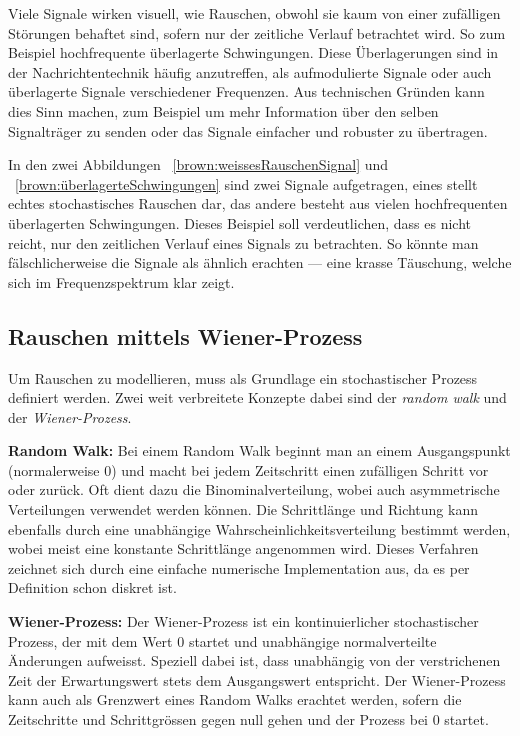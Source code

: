 Viele Signale wirken visuell, wie Rauschen, obwohl sie kaum von einer zufälligen Störungen behaftet sind, sofern nur der zeitliche Verlauf betrachtet wird. So zum Beispiel hochfrequente überlagerte Schwingungen. Diese Überlagerungen sind in der Nachrichtentechnik häufig anzutreffen, als aufmodulierte Signale oder auch überlagerte Signale verschiedener Frequenzen. Aus technischen Gründen kann dies Sinn machen, zum Beispiel um mehr Information über den selben Signalträger zu senden oder das Signale einfacher und robuster zu übertragen.


In den zwei Abbildungen ~\ref{brown:weissesRauschenSignal} und ~\ref{brown:überlagerteSchwingungen} sind zwei Signale aufgetragen, eines stellt echtes stochastisches Rauschen dar, das andere besteht aus vielen hochfrequenten überlagerten Schwingungen. Dieses Beispiel soll verdeutlichen, dass es nicht reicht, nur den zeitlichen Verlauf eines Signals zu betrachten. So könnte man fälschlicherweise die Signale als ähnlich erachten --- eine krasse Täuschung, welche sich im Frequenzspektrum klar zeigt. 



\subsection{Rauschen mittels Wiener-Prozess\label{brown:Rauschen:RandomWalkWiener}}

Um Rauschen zu modellieren, muss als Grundlage ein stochastischer Prozess definiert werden. Zwei weit verbreitete Konzepte dabei sind der \textit{random walk} und der \textit{Wiener-Prozess}.

\begin{definition}\textbf{Random Walk:}
	\label{randomWalk}
	Bei einem Random Walk beginnt man an einem Ausgangspunkt (normalerweise 0) und macht bei jedem Zeitschritt einen zufälligen Schritt vor oder zurück. Oft dient dazu die Binominalverteilung, wobei auch asymmetrische Verteilungen verwendet werden können. Die Schrittlänge und Richtung kann ebenfalls durch eine unabhängige Wahrscheinlichkeitsverteilung bestimmt werden, wobei meist eine konstante Schrittlänge angenommen wird. Dieses Verfahren zeichnet sich durch eine einfache numerische Implementation aus, da es per Definition schon diskret ist.
\end{definition}

\begin{definition}\textbf{Wiener-Prozess:}
	\label{wienerprozess}
	Der Wiener-Prozess ist ein kontinuierlicher stochastischer Prozess, der mit dem Wert 0 startet und unabhängige normalverteilte Änderungen aufweisst. Speziell dabei ist, dass unabhängig von der verstrichenen Zeit der Erwartungswert stets dem Ausgangswert entspricht. Der Wiener-Prozess kann auch als Grenzwert eines Random Walks erachtet werden, sofern die Zeitschritte und Schrittgrössen gegen null gehen und der Prozess bei 0 startet. 
\end{definition}

